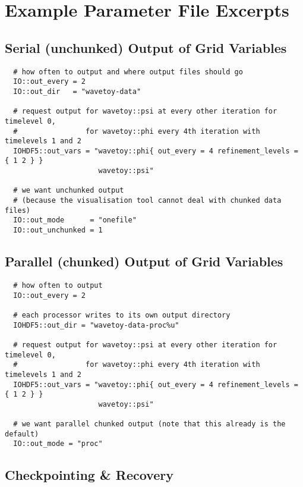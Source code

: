 \documentclass{article}
\begin{document}
\section{Example Parameter File Excerpts}

\subsection{Serial (unchunked) Output of Grid Variables}

\begin{verbatim}
  # how often to output and where output files should go
  IO::out_every = 2
  IO::out_dir   = "wavetoy-data"

  # request output for wavetoy::psi at every other iteration for timelevel 0,
  #                for wavetoy::phi every 4th iteration with timelevels 1 and 2
  IOHDF5::out_vars = "wavetoy::phi{ out_every = 4 refinement_levels = { 1 2 } }
                      wavetoy::psi"

  # we want unchunked output
  # (because the visualisation tool cannot deal with chunked data files)
  IO::out_mode      = "onefile"
  IO::out_unchunked = 1
\end{verbatim}

\subsection{Parallel (chunked) Output of Grid Variables}

\begin{verbatim}
  # how often to output
  IO::out_every = 2

  # each processor writes to its own output directory
  IOHDF5::out_dir = "wavetoy-data-proc%u"

  # request output for wavetoy::psi at every other iteration for timelevel 0,
  #                for wavetoy::phi every 4th iteration with timelevels 1 and 2
  IOHDF5::out_vars = "wavetoy::phi{ out_every = 4 refinement_levels = { 1 2 } }
                      wavetoy::psi"

  # we want parallel chunked output (note that this already is the default)
  IO::out_mode = "proc"
\end{verbatim}

\subsection{Checkpointing \& Recovery}
\end{document}
